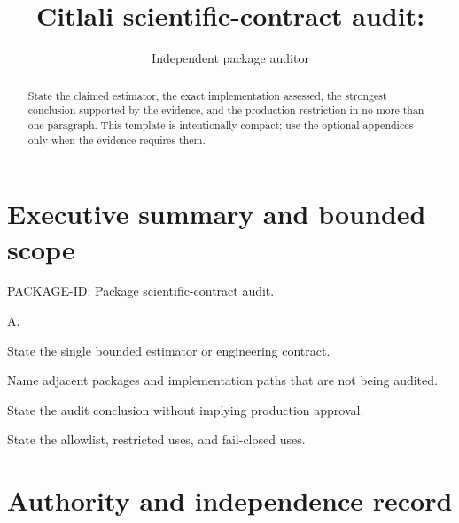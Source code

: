 \documentclass[11pt]{article}
\title{\AuditPackageName\\
\large Citlali scientific-contract audit: \AuditPackageID}
\author{Independent package auditor}
\date{\AuditDate}
\newcommand{\AuditPackageID}{PACKAGE-ID}
\newcommand{\AuditPackageName}{Package scientific-contract audit}
\newcommand{\AuditTier}{A}
\begin{document}
\maketitle

\begin{abstract}
State the claimed estimator, the exact implementation assessed, the strongest
conclusion supported by the evidence, and the production restriction in no
more than one paragraph. This template is intentionally compact; use the
optional appendices only when the evidence requires them.
\end{abstract}

\section{Executive summary and bounded scope}

\begin{description}[style=nextline]
\item[Package] \AuditPackageID: \AuditPackageName.
\item[Tier] \AuditTier.
\item[Included transformation] State the single bounded estimator or
engineering contract.
\item[Explicit exclusions] Name adjacent packages and implementation paths
that are not being audited.
\item[Claimed result] State the audit conclusion without implying production
approval.
\item[Consumer policy] State the allowlist, restricted uses, and fail-closed
uses.
\end{description}

\section{Authority and independence record}
\end{document}
